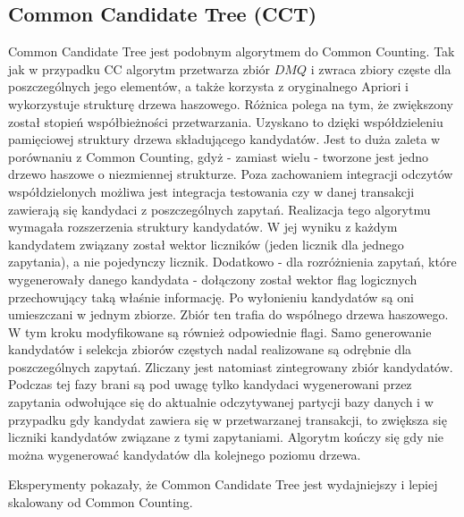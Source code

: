 \subsection{Common Candidate Tree (CCT) \cite{WojciechowskiCCT}}
\label{c326}
Common Candidate Tree jest podobnym algorytmem do Common Counting. Tak jak w przypadku CC algorytm przetwarza zbiór \(DMQ\) i zwraca zbiory częste dla poszczególnych jego elementów, a także korzysta z oryginalnego Apriori i wykorzystuje strukturę drzewa haszowego. Różnica polega na tym, że zwiększony został stopień współbieżności przetwarzania. Uzyskano to dzięki współdzieleniu pamięciowej struktury drzewa składującego kandydatów. Jest to duża zaleta w porównaniu z Common Counting, gdyż - zamiast wielu - tworzone jest jedno drzewo haszowe o niezmiennej strukturze. Poza zachowaniem integracji odczytów współdzielonych możliwa jest integracja testowania czy w danej transakcji zawierają się kandydaci z poszczególnych zapytań. Realizacja tego algorytmu wymagała rozszerzenia struktury kandydatów. W jej wyniku z każdym kandydatem związany został wektor liczników (jeden licznik dla jednego zapytania), a nie pojedynczy licznik. Dodatkowo - dla rozróżnienia zapytań, które wygenerowały danego kandydata - dołączony został wektor flag logicznych przechowujący taką właśnie informację. Po wyłonieniu kandydatów są oni umieszczani w jednym zbiorze. Zbiór ten trafia do wspólnego drzewa haszowego. W tym kroku modyfikowane są również odpowiednie flagi. Samo generowanie kandydatów i selekcja zbiorów częstych nadal realizowane są odrębnie dla poszczególnych zapytań. Zliczany jest natomiast zintegrowany zbiór kandydatów. Podczas tej fazy brani są pod uwagę tylko kandydaci wygenerowani przez zapytania odwołujące się do aktualnie odczytywanej partycji bazy danych i w przypadku gdy kandydat zawiera się w przetwarzanej transakcji, to zwiększa się liczniki kandydatów związane z tymi zapytaniami. Algorytm kończy się gdy nie można wygenerować kandydatów dla kolejnego poziomu drzewa. 

Eksperymenty \cite{WojciechowskiCCT} pokazały, że Common Candidate Tree jest wydajniejszy i lepiej skalowany od Common Counting.

